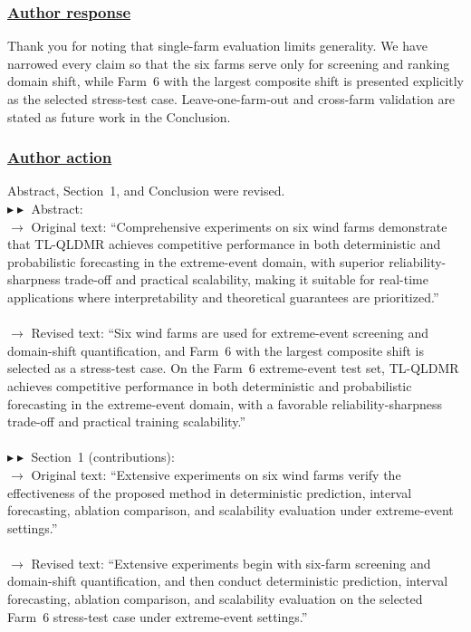 \documentclass[journal,12pn, onecolumn]{IEEEtran}
\begin{document}
{{{{{{{{\color{black}
\subsubsection*{\textbf{\underline{Author response}}}
Thank you for noting that single-farm evaluation limits generality. We have narrowed every claim so that the six farms serve only for screening and ranking domain shift, while Farm~6 with the largest composite shift is presented explicitly as the selected stress-test case. Leave-one-farm-out and cross-farm validation are stated as future work in the Conclusion.

{\color{black}
\subsubsection*{\textbf{\underline{Author action}}}
Abstract, Section~1, and Conclusion were revised.\\
$\blacktriangleright\blacktriangleright$ Abstract:\\
$\longrightarrow$ Original text: ``Comprehensive experiments on six wind farms demonstrate that TL-QLDMR achieves competitive performance in both deterministic and probabilistic forecasting in the extreme-event domain, with superior reliability-sharpness trade-off and practical scalability, making it suitable for real-time applications where interpretability and theoretical guarantees are prioritized.''\\\\
$\longrightarrow$ Revised text: ``{\color{blue}Six wind farms are used for extreme-event screening and domain-shift quantification, and Farm~6 with the largest composite shift is selected as a stress-test case. On the Farm~6 extreme-event test set,} TL-QLDMR achieves competitive performance in both deterministic and probabilistic forecasting in the extreme-event domain, with {\color{blue}a favorable reliability-sharpness trade-off and practical training scalability.}''\\\\
$\blacktriangleright\blacktriangleright$ Section~1 (contributions):\\
$\longrightarrow$ Original text: ``Extensive experiments on six wind farms verify the effectiveness of the proposed method in deterministic prediction, interval forecasting, ablation comparison, and scalability evaluation under extreme-event settings.''\\\\
$\longrightarrow$ Revised text: ``Extensive experiments {\color{blue}begin with six-farm screening and domain-shift quantification, and then conduct} deterministic prediction, interval forecasting, ablation comparison, and scalability evaluation {\color{blue}on the selected Farm~6 stress-test case} under extreme-event settings.''\\\\
}}}}}}}}}
\end{document}
